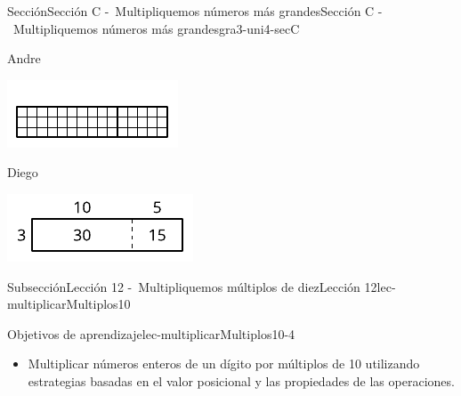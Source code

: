 \documentclass[oneside,10pt,]{article}
\begin{document}
\begin{sectionptx}{Sección}{Sección C -~Multipliquemos números más grandes}{}{Sección C -~Multipliquemos números más grandes}{}{}{gra3-uni4-secC}
\begin{introduction}{}
\begin{sidebyside}{3}{0}{0}{0.05}
\begin{sbspanel}{0.3}
\end{sbspanel}%
\begin{sbspanel}{0.3}%
Andre%
\par
\includegraphics[width=\linewidth]{external/svg-source/tikz-file-176319.pdf}
\end{sbspanel}%
\begin{sbspanel}{0.3}%
Diego%
\par
\includegraphics[width=\linewidth]{external/svg-source/tikz-file-176320.pdf}
\end{sbspanel}%
\end{sidebyside}%
\end{introduction}%
%
%
\typeout{************************************************}
\typeout{************************************************}
%
\begin{subsectionptx}{Subsección}{Lección 12 -~Multipliquemos múltiplos de diez}{}{Lección 12}{}{}{lec-multiplicarMultiplos10}
\begin{objectives}{Objetivos de aprendizaje}{lec-multiplicarMultiplos10-4}
%
\begin{itemize}[label=\textbullet]
\item{}Multiplicar números enteros de un dígito por múltiplos de 10 utilizando estrategias basadas en el valor posicional y las propiedades de las operaciones.%
\end{itemize}
\end{objectives}
\begin{introduction}{}%

\end{introduction}
\end{subsectionptx}
\end{sectionptx}
\end{document}
